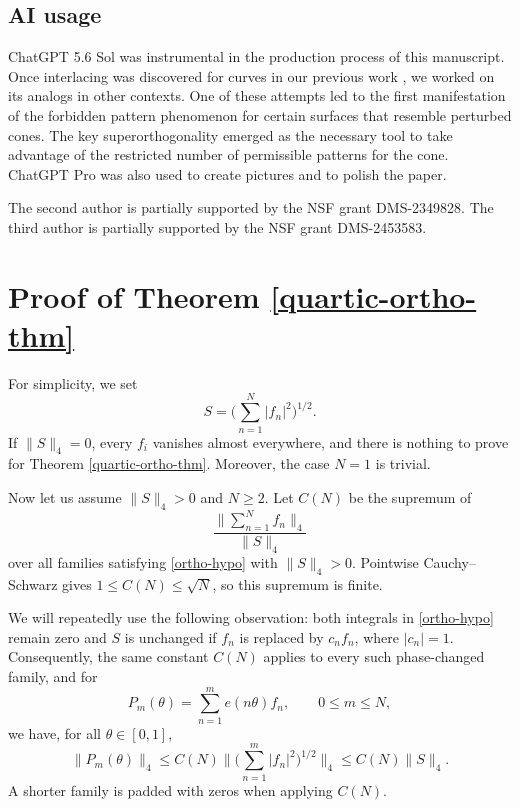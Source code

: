 \documentclass{amsart}
\numberwithin{equation}{section}
\begin{document}
\bigskip  

\subsection{AI usage} ChatGPT 5.6 Sol was instrumental in the production process of this manuscript. 
Once interlacing was discovered for curves in our previous work \cite{Cushman-Demeter-Wu}, we worked on its analogs in other contexts. 
One of these attempts led to the first manifestation of the forbidden pattern phenomenon for certain surfaces that resemble perturbed cones. 
The key superorthogonality emerged as the necessary tool to take advantage of the restricted number of permissible patterns for the cone.
ChatGPT Pro was also used to create pictures and to polish the paper. 


\bigskip  

The second author is partially supported by the NSF grant DMS-2349828.
The third author is partially supported by the NSF grant DMS-2453583.


\bigskip 

\section{Proof of Theorem \ref{quartic-ortho-thm}}
\label{proof-of-main-section}

For simplicity, we set
\begin{equation*}
    S=\Big(\sum_{n=1}^N |f_n|^2\Big)^{1/2}.
\end{equation*}
If $\|S\|_4=0$, every $f_i$ vanishes almost everywhere, and there is nothing to prove for Theorem \ref{quartic-ortho-thm}.
Moreover, the case $N=1$ is trivial.

Now let us assume $\|S\|_4> 0$ and $N\geq2$.
Let $C(N)$ be the supremum of
\[
    \frac{\Big\|\sum_{n=1}^N f_n\Big\|_4}{\|S\|_4}
\]
over all families satisfying \eqref{ortho-hypo} with $\|S\|_4>0$.
Pointwise Cauchy--Schwarz gives $1\leq C(N)\leq\sqrt N$, so this
supremum is finite.  

We will repeatedly use the following observation:
both integrals in \eqref{ortho-hypo} remain zero and $S$ is unchanged
if $f_n$ is replaced by $c_n f_n$, where $|c_n|=1$.
Consequently, the same constant $C(N)$ applies to every such phase-changed family, and for
\[
    P_m(\theta)=\sum_{n=1}^m e(n\theta)f_n, \qquad 0\le m\le N,
\]
we have, for all $\theta\in[0,1]$,
\begin{equation}
\label{partial-sums}
    \|P_m(\theta)\|_4
    \le C(N)\Big\|\Big(\sum_{n=1}^m|f_n|^2\Big)^{1/2}\Big\|_4
    \le C(N)\|S\|_4.
\end{equation}
A shorter family is padded with zeros when applying $C(N)$.
\end{document}
